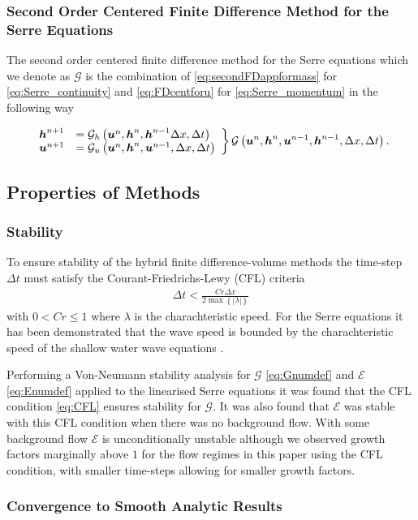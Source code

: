 \documentclass[SingleSpace,12pt,Proceedings]{Serre_ASCE}
\begin{document}
\subsubsection{Second Order Centered Finite Difference Method for the Serre Equations}
The second order centered finite difference method for the Serre equations which we denote as $\mathcal{G}$ is the combination of \eqref{eq:secondFDappformass} for \eqref{eq:Serre_continuity} and \eqref{eq:FDcentforu} for \eqref{eq:Serre_momentum} in the following way
\begin{linenomath*}
	\begin{gather}
	\left.
	\begin{array}{l l}
	\boldsymbol{h}^{n+1}&=\mathcal{G}_h\left(\boldsymbol{u}^n,\boldsymbol{h}^n,\boldsymbol{h}^{n-1} \Delta x, \Delta t \right) \\
	\boldsymbol{u}^{n+1}&=\mathcal{G}_u\left(\boldsymbol{u}^n,\boldsymbol{h}^n, \boldsymbol{u}^{n-1}, \Delta x, \Delta t \right)
	\end{array} \right\rbrace \mathcal{G}\left(\boldsymbol{u}^n,\boldsymbol{h}^n, \boldsymbol{u}^{n-1},\boldsymbol{h}^{n-1}, \Delta x, \Delta t \right).
	\label{eq:Gnumdef}
	\end{gather}
\end{linenomath*}

\subsection{Properties of Methods} 

\subsubsection{Stability}
To ensure stability of the hybrid finite difference-volume methods the time-step $\Delta t$ must satisfy the Courant-Friedrichs-Lewy (CFL) criteria \cite{Harten-etal-1983-357}
%
\begin{gather}
\label{eq:CFL}
\Delta t < \frac{Cr \Delta x}{2\max \left\lbrace |\lambda| \right\rbrace}
\end{gather}
%
with $0<Cr\le 1$ where $\lambda$ is the charachteristic speed. For the Serre equations it has been demonstrated that the wave speed is bounded by the charachteristic speed of the shallow water wave equations \cite{Hank-etal-2010-2034,Zoppou-etal-2017}. 

Performing a Von-Neumann stability analysis for $\mathcal{G}$ \eqref{eq:Gnumdef} and $\mathcal{E}$ \eqref{eq:Enumdef} applied to the linearised Serre equations \cite{Zoppou-etal-2017} it was found that the CFL condition \eqref{eq:CFL} ensures stability for $\mathcal{G}$. It was also found that $\mathcal{E}$ was stable with this CFL condition when there was no background flow. With some background flow $\mathcal{E}$ is unconditionally unstable although we observed growth factors marginally above $1$ for the flow regimes in this paper using the CFL condition, with smaller time-steps allowing for smaller growth factors.

\subsubsection{Convergence to Smooth Analytic Results}
\end{document}
